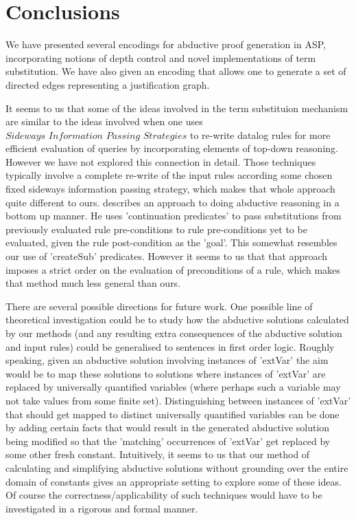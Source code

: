 \section{ Conclusions}\label{sec:conclusion}
We have presented several encodings for abductive proof generation in ASP,
incorporating notions of depth control and  novel implementations of term
substitution. We have also given an encoding that allows one to generate a set
of directed edges representing a justification graph.

It seems to us that some of the ideas involved in the term substituion
mechanism are similar to the ideas involved when one uses $\textit{Sideways
  Information Passing Strategies}$ \cite{beeri91} to re-write datalog rules
for more efficient evaluation of queries by incorporating elements of top-down
reasoning. However we have not explored this connection in detail. Those techniques 
typically involve a complete re-write of the input
rules according some chosen fixed sideways information passing strategy, which
makes that whole approach quite different to ours. \cite{DBLP:journals/jar/Stickel94} describes an approach 
to doing abductive reasoning in a bottom up manner. He uses 'continuation predicates' to pass substitutions from previously evaluated rule pre-conditions to rule pre-conditions yet to be evaluated, given the rule post-condition as the 'goal'. This somewhat resembles our use of 'createSub' predicates. However it seems to us that
that approach 
imposes a strict order on the evaluation of preconditions of a rule, which makes 
that method much less general than ours. 

There are several possible directions for future work. One possible line of theoretical investigation 
could be to study how the abductive solutions calculated by our methods (and any resulting extra
consequences of the abductive solution and input rules) could be generalised to 
sentences in first order logic. Roughly speaking, given an abductive solution involving
instances of 'extVar' the aim would be to map these solutions to solutions where instances
of 'extVar' are replaced by universally quantified variables (where perhaps such a variable may
not take values from some finite set).  Distinguishing between instances of 'extVar' that should 
get mapped to distinct universally quantified variables can be done by adding certain facts 
that would result in the generated abductive solution being modified so that the 'matching' 
occurrences of 'extVar' get replaced by some other fresh constant. Intuitively, it seems to 
us that our method of calculating and simplifying abductive solutions without grounding over
the entire domain of constants gives an appropriate 
setting to explore some of these ideas. Of course the correctness/applicability of such techniques 
would have to be investigated in a rigorous and formal manner.


